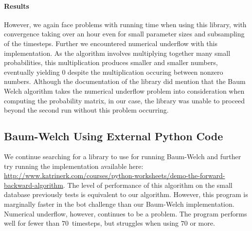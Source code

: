 \documentclass[twoside]{article}
\begin{document}
\paragraph{Results}

However, we again face problems with running time when using this library, with convergence taking over an hour even for small parameter sizes and subsampling of the timesteps.
Further we encountered numerical underflow with this implementation.
As the algorithm involves multiplying together many small probabilities, this multiplication produces smaller and smaller numbers, eventually yielding $0$ despite the multiplication occuring between nonzero numbers.
Although the documentation of the library did mention that the Baum Welch algorithm takes the numerical underflow problem into consideration when computing the probability matrix, in our case, the library was unable to proceed beyond the second run without this problem occurring.


\subsection{Baum-Welch Using External Python Code}\label{sec:baum-welch-using}
We continue searching for a library to use for running Baum-Welch and further try running the implementation available here:\\ {\footnotesize\url{http://www.katrinerk.com/courses/python-worksheets/demo-the-forward-backward-algorithm}}.
The level of performance of this algorithm on the small database previously tests is equivalent to our algorithm.
However, this program is marginally faster in the bot challenge than our Baum-Welch implementation.
Numerical underflow, however, continues to be a problem.
The program performs well for fewer than $\num{70}$~timesteps, but struggles when using $\num{70}$ or more.
\end{document}
